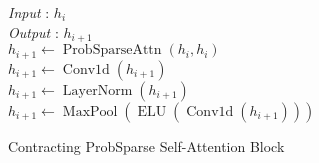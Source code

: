 \begin{algorithm}[H]
\label{alg:contracting}
    \textit{Input}  : $h_i$  \\
    \textit{Output} : $h_{i+1}$\\
    $h_{i+1} \gets \operatorname{ProbSparseAttn} (h_i, h_i)$ \\
    $h_{i+1} \gets \operatorname{Conv1d} (h_{i+1})$\\
    $h_{i+1} \gets \operatorname{LayerNorm} (h_{i+1})$ \\
    $h_{i+1} \gets \operatorname{MaxPool}(\operatorname{ELU}(\operatorname{Conv1d} (h_{i+1})))$
 \caption{Contracting ProbSparse Self-Attention Block} 
\end{algorithm}









